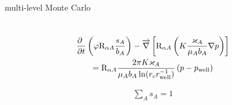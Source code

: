 multi-level Monte Carlo

\section{}

\begin{multline}
    \deriv{~}{t}\left(
        \varphi \matr{R}_{\alpha A} \frac{s_A}{b_A}
    \right) - \overrightarrow{\nabla} \left[
        \matr{R}_{\alpha A} \left(
            K\frac{\varkappa_A}{\mu_A b_A}\nabla p
        \right)
    \right] \\
    = \matr{R}_{\alpha A}
    \frac{2\pi K \varkappa_A}{\mu_A b_A \ln(r_c r_\text{well}^{-1})}
    \left(p - p_\text{well}\right)
\end{multline}

\begin{align}
    \sum_A s_A = 1
\end{align}
